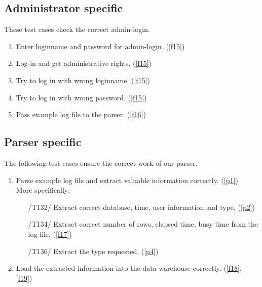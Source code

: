 \subsection{Administrator specific}

These test cases check the correct admin-login.

\begin{enumerate}[resume*=test]

\item Enter loginname and password for admin-login. (\ref{f15})
\label{t17}

\item Log-in and get administrative rights. (\ref{f15})
\label{t18}

\item Try to log in with wrong loginname. (\ref{f15})
\label{t19}

\item Try to log in with wrong password. (\ref{f15})
\label{t20}

\item Pass example \gls{log file} to the \gls{parser}. (\ref{f16})
\label{t21}


\end{enumerate}

\newpage
\subsection{Parser specific}

The following test cases ensure the correct work of our \gls{parser}.

\begin{enumerate}[resume*=test]

\item Parse example \gls{log file} and extract valuable information correctly. (\ref{p1})
	\\ More specifically: 
\label{t22}
  \begin{enumerate}

	\item[/T132/] Extract correct \gls{database}, time, user information 
	and type, (\ref{p2})
\label{t23}

	\item[/T134/] Extract correct number of \glspl{row}, \gls{elapsed time}, 
	\gls{busy time} from the \gls{log file}, (\ref{f17})
\label{t24}	
	
	\item[/T136/] Extract the type requested. (\ref{p4})
\label{t25}

  \end{enumerate}

\item Load the extracted information into the \gls{data warehouse} correctly. (\ref{f18}, \ref{f19})
\label{t26}

\end{enumerate}


